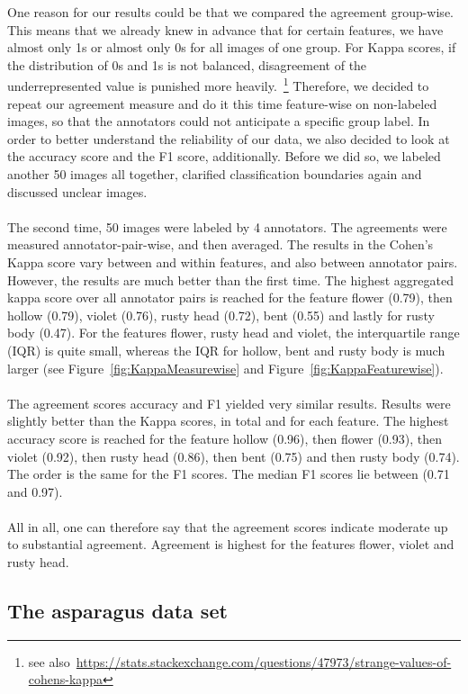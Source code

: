 {One reason for our results could be that we compared the agreement group-wise. This means that we already knew in advance that for certain features, we have almost only 1s or almost only 0s for all images of one group. For Kappa scores, if the distribution of 0s and 1s is not balanced, disagreement of the underrepresented value is punished more heavily.~\footnote{see also~\url{https://stats.stackexchange.com/questions/47973/strange-values-of-cohens-kappa}} Therefore, we decided to repeat our agreement measure and do it this time feature-wise on non-labeled images, so that the annotators could not anticipate a specific group label. In order to better understand the reliability of our data, we also decided to look at the accuracy score and the F1 score, additionally. Before we did so, we labeled another 50 images all together, clarified classification boundaries again and discussed unclear images. \\
\\
The second time, 50 images were labeled by 4 annotators. The agreements were measured annotator-pair-wise, and then averaged. The results in the Cohen’s Kappa score vary between and within features, and also between annotator pairs. However, the results are much better than the first time. The highest aggregated kappa score over all annotator pairs is reached for the feature flower (0.79), then hollow (0.79), violet (0.76), rusty head (0.72), bent (0.55) and lastly for rusty body (0.47).
For the features flower, rusty head and violet, the interquartile range (IQR) is quite small, whereas the IQR for hollow, bent and rusty body is much larger (see Figure~\ref{fig:KappaMeasurewise} and Figure~\ref{fig:KappaFeaturewise}).  \\
\\
The agreement scores accuracy and F1 yielded very similar results. Results were slightly better than the Kappa scores, in total and  for each feature. The highest accuracy score is reached for the feature hollow (0.96), then flower (0.93), then violet (0.92), then rusty head (0.86), then bent (0.75) and then rusty body (0.74). The order is the same for the F1 scores. The median F1 scores lie between (0.71 and 0.97). \\
\\
All in all, one can therefore say that the agreement scores indicate moderate up to substantial agreement. Agreement is highest for the features flower, violet and rusty head.


\subsection{The asparagus data set}
\label{sec:AsparagusDataSet}

}
